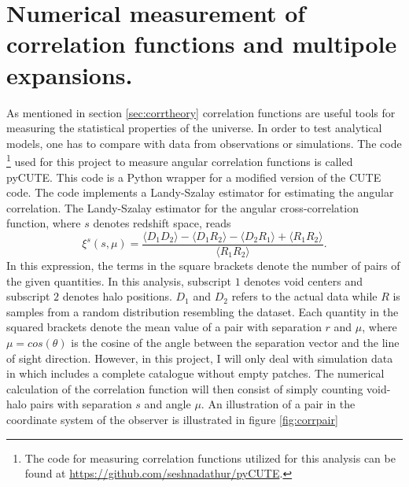 \section{Numerical measurement of correlation functions and multipole expansions.}\label{sec:numerical_corr}
As mentioned in section \ref{sec:corrtheory} correlation functions are useful
tools for measuring the statistical properties of the universe. In order to test
analytical models, one has to compare with data from observations or simulations.
The code \footnote{The code for measuring correlation functions utilized for this analysis can be found at \url{https://github.com/seshnadathur/pyCUTE}.} used for this project to measure angular correlation functions
is called pyCUTE. This code is a Python wrapper for a modified version of the CUTE\cite{alonso2013cute} code. The code implements a Landy-Szalay estimator \cite{Landy} for estimating the angular correlation. The Landy-Szalay estimator
for the angular cross-correlation function, where $s$ denotes redshift space, reads
\begin{equation}
    \xi^s(s,\mu)=\frac{\langle D_1D_2\rangle-\langle D_1R_2\rangle-\langle D_2R_1\rangle+\langle R_1R_2\rangle}{\langle R_1R_2\rangle}.
\end{equation}
In this expression, the terms in the square brackets denote the number of pairs of the given quantities. In this analysis, subscript $1$ denotes void centers and subscript $2$ denotes halo positions. $D_1$
and $D_2$ refers to the actual data while $R$ is samples from a random
distribution resembling the dataset. Each quantity in the squared brackets
denote the mean value of a pair with separation $r$ and $\mu$, where
$\mu=cos(\theta)$ is the cosine of the angle between the separation vector and
the line of sight direction. However, in this project, I will only deal with simulation data in which includes a complete catalogue without empty patches.
The numerical calculation of the correlation function will then consist of simply counting void-halo pairs with separation $s$ and angle $\mu$.
An illustration of a pair in the coordinate system
of the observer is illustrated in figure \ref{fig:corrpair}
